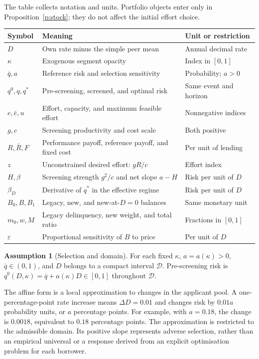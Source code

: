 \documentclass[11pt]{article}
\theoremstyle{definition}\newtheorem{assumption}{Assumption}
\begin{document}
The table collects notation and units. Portfolio objects enter only in
Proposition~\ref{p:stock}; they do not affect the initial effort choice.
\begin{center}\small
\begin{tabular}{@{}L{.15\linewidth}L{.51\linewidth}L{.27\linewidth}@{}}
\toprule Symbol & Meaning & Unit or restriction\\\midrule
$D$ & Own rate minus the simple peer mean & Annual decimal rate\\
$\kappa$ & Exogenous segment opacity & Index in $[0,1]$\\
$\bar q,a$ & Reference risk and selection sensitivity & Probability; $a>0$\\
$q^0,q,q^*$ & Pre-screening, screened, and optimal risk & Same event and horizon\\
$e,\bar e,u$ & Effort, capacity, and maximum feasible effort & Nonnegative indices\\
$g,c$ & Screening productivity and cost scale & Both positive\\
$R,\bar R,F$ & Performance payoff, reference payoff, and fixed cost & Per unit of lending\\
$z$ & Unconstrained desired effort: $gR/c$ & Effort index\\
$H,\beta$ & Screening strength $g^2/c$ and net slope $a-H$ & Risk per unit of $D$\\
$\beta_D$ & Derivative of $q^*$ in the effective regime & Risk per unit of $D$\\
$B_0,B,B_1$ & Legacy, new, and new-at-$D=0$ balances & Same monetary unit\\
$m_0,w,M$ & Legacy delinquency, new weight, and total ratio & Fractions in $[0,1]$\\
$\varepsilon$ & Proportional sensitivity of $B$ to price & Per unit of $D$\\
\bottomrule
\end{tabular}
\end{center}

\begin{assumption}[Selection and domain]\label{as:selection}
For each fixed $\kappa$, $a=a(\kappa)>0$, $\bar q\in(0,1)$, and $D$ belongs
to a compact interval $\mathcal D$. Pre-screening risk is
$q^0(D,\kappa)=\bar q+a(\kappa)D\in[0,1]$ throughout $\mathcal D$.
\end{assumption}
The affine form is a local approximation to changes in the applicant pool.
A one-percentage-point rate increase means $\Delta D=0.01$ and changes risk
by $0.01a$ probability units, or $a$ percentage points. For example, with
$a=0.18$, the change is $0.0018$, equivalent to $0.18$ percentage points.
The approximation is restricted to the admissible domain. Its positive slope
represents adverse selection, rather than an empirical universal or a response
derived from an explicit optimisation problem for each borrower.
\end{document}
